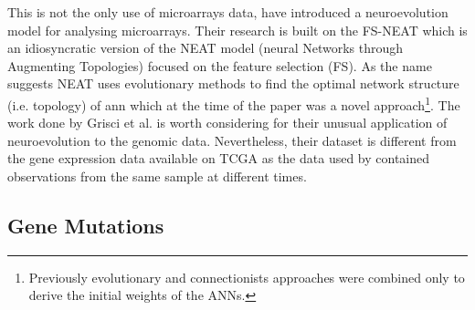 This is not the only use of microarrays data, \citet{Grisci2019-xn} have introduced a neuroevolution model for analysing microarrays. Their research is built on the FS-NEAT\cite{Whiteson2005-dn} which is an idiosyncratic version of the NEAT model (neural Networks through Augmenting Topologies)\cite{Stanley2002-tg} focused on the feature selection (FS). As the name suggests NEAT\cite{Stanley2002-tg} uses evolutionary methods to find the optimal network structure (i.e. topology) of \acrshort{ann} which at the time of the paper was a novel approach\footnote{Previously evolutionary and connectionists approaches were combined only to derive the initial weights of the ANNs.}. The work done by Grisci et al. is worth considering for their unusual application of neuroevolution to the genomic data. Nevertheless, their dataset is different from the gene expression data available on TCGA as the data used by \citet{Grisci2019-xn} contained observations from the same sample at different times.



\subsection{Gene Mutations} \label{s:mutations}

\vspace{3mm}
\vspace{3mm}


